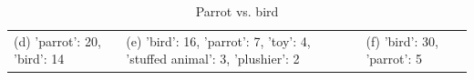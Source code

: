 \documentclass[11pt,a4paper]{article}
\begin{document}
\begin{table}[t]
\begin{tabularx}{\textwidth}{XXX}
\\
(d) 'parrot': 20, 'bird': 14
& (e) 'bird': 16, 'parrot': 7, 'toy': 4, 'stuffed animal': 3, 'plushier': 2
& (f) 'bird': 30, 'parrot': 5
\end{tabularx}
\caption{\label{tab:parrot} Parrot vs. bird}
\end{table}
\end{document}
